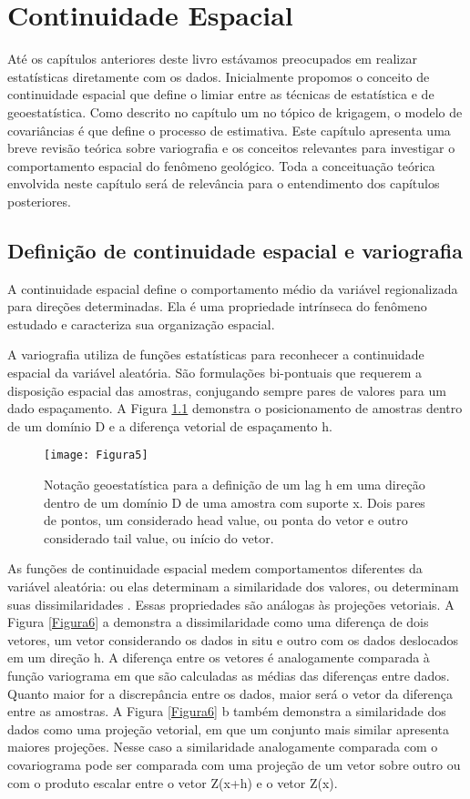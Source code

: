 \chapter{Continuidade Espacial}

Até os capítulos anteriores deste livro estávamos preocupados em realizar estatísticas diretamente com os dados. Inicialmente  propomos o conceito de continuidade espacial que define o limiar entre as técnicas de estatística e de geoestatística. Como descrito no capítulo um no tópico de krigagem, o modelo de covariâncias é que define o processo de estimativa.  Este capítulo apresenta uma breve revisão teórica sobre variografia e os conceitos relevantes para investigar o comportamento espacial do fenômeno geológico.  Toda a conceituação teórica envolvida neste capítulo será de relevância para o entendimento dos capítulos posteriores. 

\section{Definição de continuidade espacial e variografia}

A continuidade espacial define o comportamento médio da variável regionalizada para direções determinadas.  Ela é uma propriedade intrínseca do fenômeno estudado e caracteriza sua organização espacial. 

A variografia utiliza de funções estatísticas para reconhecer a continuidade espacial da variável aleatória. São formulações bi-pontuais que requerem a disposição espacial das amostras, conjugando sempre pares de valores para um dado espaçamento. A Figura \ref{Figura5} demonstra o posicionamento de amostras dentro de um domínio D e a diferença vetorial de espaçamento h. 

\begin{figure}[h]
	\centering
	\texttt{[image: Figura5]}
	\caption{Notação geoestatística para a definição de um lag h em uma direção dentro de um domínio D de uma amostra com suporte x. Dois pares de pontos, um considerado head value, ou ponta do vetor e outro considerado tail value, ou início do vetor.}
	\label{Figura5}
\end{figure}

As funções de continuidade espacial medem comportamentos diferentes da variável aleatória: ou elas determinam a similaridade dos valores, ou determinam suas dissimilaridades . Essas propriedades são análogas às projeções vetoriais. A Figura \ref{Figura6} a demonstra a dissimilaridade como uma diferença de dois vetores, um vetor considerando os dados in situ e outro com os dados deslocados em um direção h. A diferença entre os vetores é analogamente comparada à função variograma em que são calculadas as médias das diferenças entre dados. Quanto maior for a discrepância entre os dados, maior será o vetor da diferença entre as amostras. A Figura \ref{Figura6} b também demonstra a similaridade dos dados como uma projeção vetorial, em que um conjunto mais similar apresenta maiores projeções. Nesse caso a similaridade analogamente comparada com o covariograma pode ser comparada com uma projeção de um vetor sobre outro ou com o produto escalar entre o vetor Z(x+h) e o vetor Z(x).

